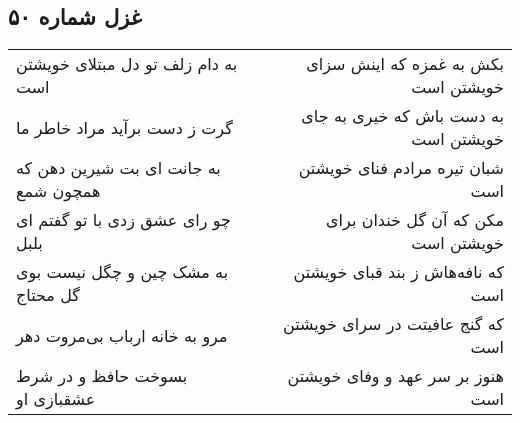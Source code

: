 \begin{center}
\section*{غزل شماره ۵۰}
\label{sec:sh050}
\begin{longtable}{l p{0.5cm} r}
به دام زلف تو دل مبتلای خویشتن است
&&
بکش به غمزه که اینش سزای خویشتن است
\\
گرت ز دست برآید مراد خاطر ما
&&
به دست باش که خیری به جای خویشتن است
\\
به جانت ای بت شیرین دهن که همچون شمع
&&
شبان تیره مرادم فنای خویشتن است
\\
چو رای عشق زدی با تو گفتم ای بلبل
&&
مکن که آن گل خندان برای خویشتن است
\\
به مشک چین و چگل نیست بوی گل محتاج
&&
که نافه‌هاش ز بند قبای خویشتن است
\\
مرو به خانه ارباب بی‌مروت دهر
&&
که گنج عافیتت در سرای خویشتن است
\\
بسوخت حافظ و در شرط عشقبازی او
&&
هنوز بر سر عهد و وفای خویشتن است
\\
\end{longtable}
\end{center}
